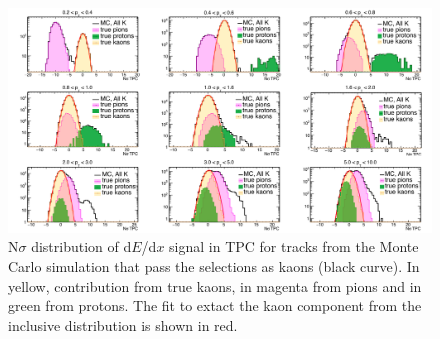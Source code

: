 \begin{figure}[!h]
 \centering
 \includegraphics[angle=0, width=15cm]{./FigCap5/KaonTPCFromTOF_MC.png}
 \caption{N$\sigma$ distribution of d$E$/d$x$ signal in TPC for tracks from the Monte Carlo simulation that pass the selections as kaons (black curve). In yellow, contribution from true kaons, in magenta from pions and in green from protons. The fit to extact the kaon component from the inclusive distribution is shown in red.}
 \label{fig:MCKaonsTPC} 
\end{figure}

